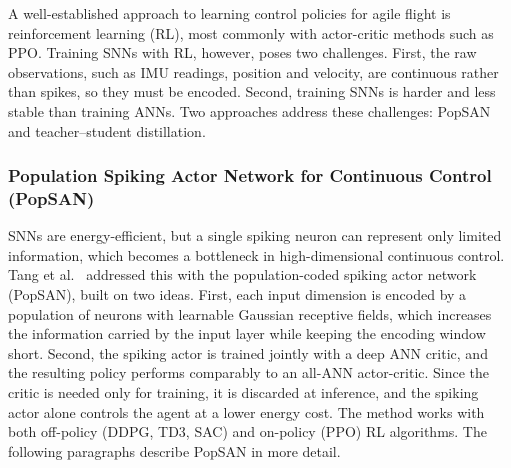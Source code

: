 A well-established approach to learning control policies for agile flight is reinforcement learning (RL), most commonly with actor-critic methods such as PPO. Training SNNs with RL, however, poses two challenges. First, the raw observations, such as IMU readings, position and velocity, are continuous rather than spikes, so they must be encoded. Second, training SNNs is harder and less stable than training ANNs. Two approaches address these challenges: PopSAN and teacher--student distillation.

\subsubsection{Population Spiking Actor Network for Continuous Control (PopSAN)}
SNNs are energy-efficient, but a single spiking neuron can represent only limited information, which becomes a bottleneck in high-dimensional continuous control. Tang et al.~\cite{tangDeepReinforcementLearning2020} addressed this with the population-coded spiking actor network (PopSAN), built on two ideas. First, each input dimension is encoded by a population of neurons with learnable Gaussian receptive fields, which increases the information carried by the input layer while keeping the encoding window short. Second, the spiking actor is trained jointly with a deep ANN critic, and the resulting policy performs comparably to an all-ANN actor-critic. Since the critic is needed only for training, it is discarded at inference, and the spiking actor alone controls the agent at a lower energy cost. The method works with both off-policy (DDPG, TD3, SAC) and on-policy (PPO) RL algorithms. The following paragraphs describe PopSAN in more detail.

